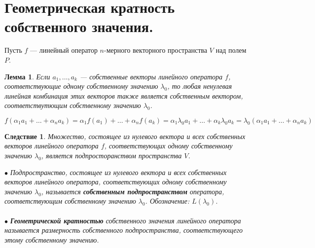 \section {Геометрическая кратность собственного значения.}
Пусть $f$ --- линейный оператор $n$-мерного векторного пространства $V$ над полем $P$.
\newtheorem*{lem11_9_1}{Лемма}\begin{lem11_9_1}Если $a_1,\dots,a_k$ --- собственные векторы линейного оператора $f$, соответствующие одному собственному значению $\lambda_0$, то любая ненулевая линейная комбинация этих векторов также является собственным вектором, соответствутющим собственному значению $\lambda_0$.
\end{lem11_9_1}\begin{Proof}
	$f(\alpha_1 a_1+ \ldots +\alpha_n a_k) = \alpha_1 f(a_1) + \ldots + \alpha_n f(a_k) = \alpha_1 \lambda_0 a_1 + \ldots + \alpha_k \lambda_0 a_k = \lambda_0(\alpha_1 a_1+ \ldots +\alpha_n a_k) $
\end{Proof}
\newtheorem*{cor11_9_1}{Следствие}\begin{cor11_9_1}Множество, состоящее из нулевого вектора и всех
	собственных векторов линейного оператора $f$, соответствующих одному собственному значению $\lambda_0$, является
	подпросторанством пространства $V$.
\end{cor11_9_1}
$\bullet$ \textit{Подпространство, состоящее из нулевого вектора и всех собственных векторов линейного оператора, соответствующих одному собственному значению $\lambda_0$, называется \textbf{собственным подпространством} оператора, соответствующим собственному значению $\lambda_0$. Обозначение: $L(\lambda_0)$.}\\\\
$\bullet$ \textit{\textbf{Геометрической кратностью} собственного значения линейного оператора называется размерность собственного подпространства, соответствующего этому собственному значению.}\\\\
